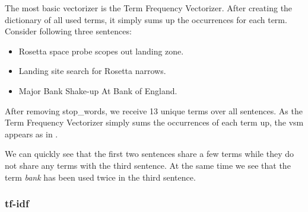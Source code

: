 The most basic \gls{vectorizer} is the Term Frequency Vectorizer.
After creating the dictionary of all used terms, it simply sums up the occurrences for each term.
Consider following three sentences:

\begin{itemize}
    \item Rosetta space probe scopes out landing zone.
    \item Landing site search for Rosetta narrows.
    \item Major Bank Shake-up At Bank of England.
\end{itemize}

After removing \glspl{stop_word}, we receive 13 unique terms over all sentences.
As the Term Frequency Vectorizer simply sums the occurrences of each term up,
the \Gls{vsm} appears as in .

\begin{table}[h]
    \centering
    \caption{Term frequency \Gls{vsm}.}
    \label{tab:tf_vsm}
\end{table}

We can quickly see that the first two sentences share a few terms
while they do not share any terms with the third sentence.
At the same time we see that the term \textit{bank} has been used twice in the third sentence.

\subsubsection{tf-idf}
\label{subsubsec:3_tf_idf}

